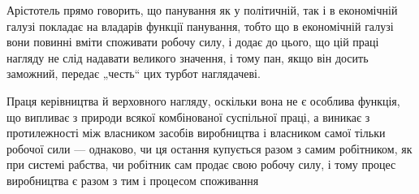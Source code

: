 Арістотель прямо говорить, що панування як у політичній,
так і в економічній галузі покладає на владарів функції панування,
тобто що в економічній галузі вони повинні вміти споживати
робочу силу, і додає до цього, що цій праці нагляду не слід надавати
великого значення, і тому пан, якщо він досить заможний,
передає „честь“ цих турбот наглядачеві.

Праця керівництва й верховного нагляду, оскільки вона не є
особлива функція, що випливає з природи всякої комбінованої
суспільної праці, а виникає з протилежності між власником засобів
виробництва і власником самої тільки робочої сили — однаково,
чи ця остання купується разом з самим робітником, як при
системі рабства, чи робітник сам продає свою робочу силу, і тому
процес виробництва є разом з тим і процесом споживання
\parbreak{}  %
